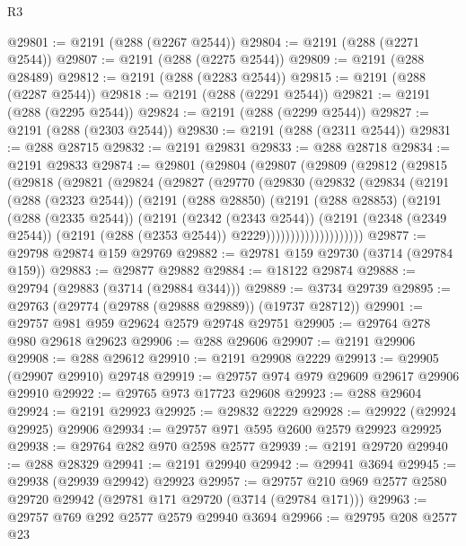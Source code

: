 \begin{lexlean}{R3}
\begin{coremodule}
@29801 := @2191 (@288 (@2267 @2544))
@29804 := @2191 (@288 (@2271 @2544))
@29807 := @2191 (@288 (@2275 @2544))
@29809 := @2191 (@288 @28489)
@29812 := @2191 (@288 (@2283 @2544))
@29815 := @2191 (@288 (@2287 @2544))
@29818 := @2191 (@288 (@2291 @2544))
@29821 := @2191 (@288 (@2295 @2544))
@29824 := @2191 (@288 (@2299 @2544))
@29827 := @2191 (@288 (@2303 @2544))
@29830 := @2191 (@288 (@2311 @2544))
@29831 := @288 @28715
@29832 := @2191 @29831
@29833 := @288 @28718
@29834 := @2191 @29833
@29874 := @29801
    (@29804
      (@29807
        (@29809
          (@29812
            (@29815
              (@29818
                (@29821
                  (@29824
                    (@29827
                      (@29770
                        (@29830
                          (@29832
                            (@29834
                              (@2191
                                (@288 (@2323 @2544))
                                (@2191
                                  (@288 @28850)
                                  (@2191
                                    (@288 @28853)
                                    (@2191
                                      (@288 (@2335 @2544))
                                      (@2191
                                        (@2342 (@2343 @2544))
                                        (@2191
                                          (@2348 (@2349 @2544))
                                          (@2191 (@288 (@2353 @2544)) @2229))))))))))))))))))))
@29877 := @29798 @29874 @159 @29769
@29882 := @29781 @159 @29730 (@3714 (@29784 @159))
@29883 := @29877 @29882
@29884 := @18122 @29874
@29888 := @29794 (@29883 (@3714 (@29884 @344)))
@29889 := @3734 @29739
@29895 := @29763 (@29774 (@29788 (@29888 @29889)) (@19737 @28712))
@29901 := @29757 @981 @959 @29624 @2579 @29748 @29751
@29905 := @29764 @278 @980 @29618 @29623
@29906 := @288 @29606
@29907 := @2191 @29906
@29908 := @288 @29612
@29910 := @2191 @29908 @2229
@29913 := @29905 (@29907 @29910) @29748
@29919 := @29757 @974 @979 @29609 @29617 @29906 @29910
@29922 := @29765 @973 @17723 @29608
@29923 := @288 @29604
@29924 := @2191 @29923
@29925 := @29832 @2229
@29928 := @29922 (@29924 @29925) @29906
@29934 := @29757 @971 @595 @2600 @2579 @29923 @29925
@29938 := @29764 @282 @970 @2598 @2577
@29939 := @2191 @29720
@29940 := @288 @28329
@29941 := @2191 @29940
@29942 := @29941 @3694
@29945 := @29938 (@29939 @29942) @29923
@29957 := @29757 @210 @969 @2577 @2580 @29720 @29942 (@29781 @171 @29720 (@3714 (@29784 @171)))
@29963 := @29757 @769 @292 @2577 @2579 @29940 @3694
@29966 := @29795 @208 @2577 @23

\end{coremodule}
\end{lexlean}
